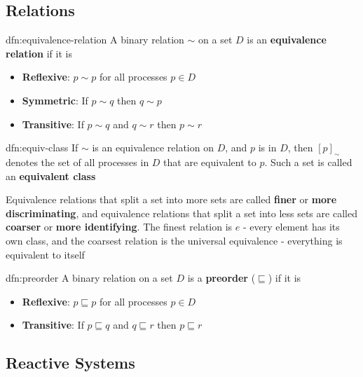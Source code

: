 \documentclass{article}
\begin{document}
\newpage

\subsection{Relations}

\begin{dfn}{dfn:equivalence-relation}{}
    A binary relation $\sim$ on a set $D$ is an \textbf{equivalence relation} if it is
    \begin{itemize}
        \item \textbf{Reflexive}: $p \sim p$ for all processes $p\in D$
        \item \textbf{Symmetric}: If $p \sim q$ then $q \sim p$
        \item \textbf{Transitive}: If $p \sim q$ and $q \sim r$ then $p \sim r$
    \end{itemize}
\end{dfn}

\begin{dfn}{dfn:equiv-class}{}
    If $\sim$ is an equivalence relation on $D$, and $p$ is in $D$, then $[p]_{\sim}$ denotes the set of all processes in $D$ that are equivalent to $p$. Such a set is called an \textbf{equivalent class}

    \longrule{0.08ex}

    Equivalence relations that split a set into more sets are called \textbf{finer} or \textbf{more discriminating}, and equivalence relations that split a set into less sets are called \textbf{coarser} or \textbf{more identifying}. The finest relation is $e$ - every element has its own class, and the coarsest relation is the universal equivalence - everything is equivalent to itself
\end{dfn}

\begin{dfn}{dfn:preorder}{}
    A binary relation on a set $D$ is a \textbf{preorder} ($\sqsubseteq$) if it is
    \begin{itemize}
        \item \textbf{Reflexive}: $p \sqsubseteq p$ for all processes $p\in D$
        \item \textbf{Transitive}: If $p \sqsubseteq q$ and $q \sqsubseteq r$ then $p \sqsubseteq r$
    \end{itemize}
\end{dfn}

\subsection{Reactive Systems}
\end{document}
